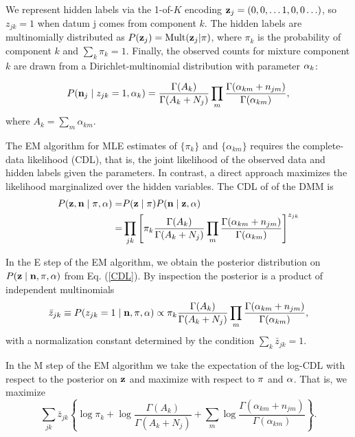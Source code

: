 \documentclass[nofootinbib,amssymb,amsmath]{revtex4}
\begin{document}
We represent hidden labels via the 1-of-$K$ encoding ${\bf z}_j = (0, 0, \ldots 1, 0, 0 \ldots)$, so $z_{jk} = 1$ when datum j comes from component $k$.  The hidden labels are multinomially distributed as $P({\bf z}_j) = {\rm Mult}({\bf z}_j | {\bf \pi})$, where $\pi_k$ is the probability of component $k$ and $\sum_k \pi_k = 1$.  Finally, the observed counts for mixture component $k$ are drawn from a Dirichlet-multinomial distribution with parameter ${\bf \alpha}_k$:

\begin{equation}
P({\bf n}_j \mid z_{jk} = 1, {\bf \alpha}_k ) = \frac{ \Gamma (A_k) }{ \Gamma (A_k + N_j) } \prod_m \frac{ \Gamma (\alpha_{km} + n_{jm}) }{ \Gamma (\alpha_{km}) },
\end{equation}
where $A_k = \sum_m \alpha_{km}$.

The EM algorithm for MLE estimates of $\{ \pi_k \}$ and $\{ \alpha_{km} \}$ requires the complete-data likelihood (CDL), that is, the joint likelihood of the observed data and hidden labels given the parameters.  In contrast, a direct approach maximizes the likelihood marginalized over the hidden variables.  The CDL of of the DMM is
\begin{align}
P({\bf z}, {\bf n} \mid {\bf \pi}, {\bf \alpha}) = & P({\bf z} \mid {\bf \pi}) P({\bf n} \mid {\bf z}, {\bf \alpha}) \\
= & \prod_{jk}  \left[ \pi_k \frac{ \Gamma (A_k) }{ \Gamma (A_k + N_j) } \prod_m \frac{ \Gamma (\alpha_{km} + n_{jm}) }{ \Gamma (\alpha_{km}) } \right]^{z_{jk}} \label{CDL}
\end{align}

In the E step of the EM algorithm, we obtain the posterior distribution on $P({\bf z} \mid {\bf n}, {\bf \pi}, {\bf \alpha})$ from Eq. (\ref{CDL}).  By inspection the posterior is a product of independent multinomials
\begin{equation}
\label{DMM_E_step}
\bar{z}_{jk} \equiv P(z_{jk} = 1 \mid {\bf n}, {\bf \pi}, {\bf \alpha})  \propto \pi_k \frac{ \Gamma (A_k) }{ \Gamma (A_k + N_j) } \prod_m \frac{ \Gamma (\alpha_{km} + n_{jm}) }{ \Gamma (\alpha_{km}) },
\end{equation}
with a normalization constant determined by the condition $\sum_k \bar{z}_{jk} = 1$.

In the M step of the EM algorithm we take the expectation of the log-CDL with respect to the posterior on ${\bf z}$ and maximize with respect to ${\bf \pi}$ and ${\bf \alpha}$.  That is, we maximize
\begin{equation}
\sum_{jk}  \bar{z}_{jk} \left\{ \log \pi_k + \log \frac{\Gamma (A_k)}{ \Gamma (A_k + N_j)}  + \sum_m \log \frac{ \Gamma (\alpha_{km} + n_{jm})}{\Gamma (\alpha_{km})}  \right\}.
\end{equation}
\end{document}
